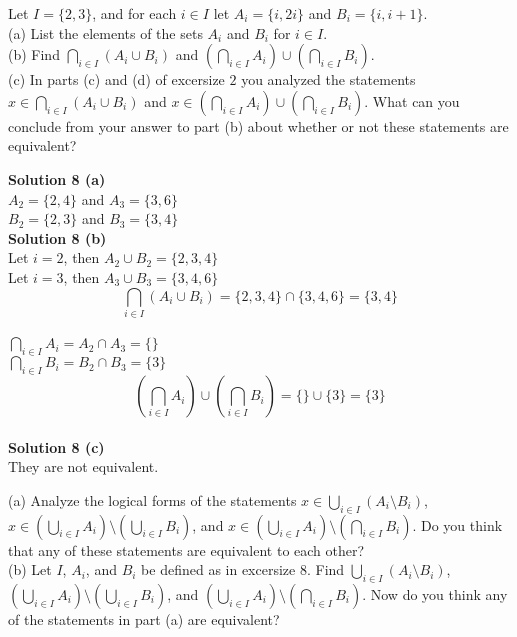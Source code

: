 \begin{tcolorbox}[title=Problem 8, breakable]
    Let $I = \{2, 3\}$, and for each $i \in I$ let $A_i = \{i, 2i\}$ and $B_i = \{i, i + 1\}$. \\
    (a) List the elements of the sets $A_i$ and $B_i$ for $i \in I$. \\
    (b) Find $\bigcap_{i \in I}(A_i \cup B_i)$ 
        and $(\bigcap_{i \in I} A_i)\cup(\bigcap_{i \in I} B_i)$. \\
    (c) In parts (c) and (d) of excersize $2$ you analyzed the statements
        $x \in \bigcap_{i \in I}(A_i \cup B_i)$ and 
        $x \in (\bigcap_{i \in I} A_i) \cup (\bigcap_{i \in I} B_i)$.
        What can you conclude from your answer to part (b) about whether or not these statements
        are equivalent?
\end{tcolorbox}

\textbf{Solution 8 (a)} \\
$A_2 = \{2, 4\}$ and $A_3 = \{3, 6\}$ \\
$B_2 = \{2, 3\}$ and $B_3 = \{3, 4\}$ \\
\textbf{Solution 8 (b)} \\
Let $i = 2$, then $A_2 \cup B_2 = \{2, 3, 4\}$ \\
Let $i = 3$, then $A_3 \cup B_3 = \{3, 4, 6\}$ \\
$$\bigcap_{i \in I}(A_i \cup B_i) = \{2, 3, 4\} \cap \{3, 4, 6\} = \{3, 4\}$$ \\
$\bigcap_{i \in I}A_i = A_2 \cap A_3 = \{\}$ \\
$\bigcap_{i \in I}B_i = B_2 \cap B_3 = \{3\}$ \\
$$\left(\bigcap_{i \in I} A_i\right) \cup \left(\bigcap_{i \in I} B_i\right) = \{\} \cup \{3\} = \{3\}$$ \\
\textbf{Solution 8 (c)} \\
They are not equivalent.

\begin{tcolorbox}[title=Problem 9, breakable]
    (a) Analyze the logical forms of the statements $x \in \bigcup_{i \in I}(A_i \setminus B_i)$,
    $x \in (\bigcup_{i \in I}A_i) \setminus (\bigcup_{i \in I} B_i)$, and
    $x \in (\bigcup_{i \in I}A_i) \setminus (\bigcap_{i \in I} B_i)$. Do you think
    that any of these statements are equivalent to each other? \\
    (b) Let $I$, $A_i$, and $B_i$ be defined as in excersize $8$. Find $\bigcup_{i \in I}(A_i \setminus B_i)$,
    $(\bigcup_{i \in I}A_i) \setminus (\bigcup_{i \in I}B_i)$, and
    $(\bigcup_{i \in I}A_i) \setminus (\bigcap_{i \in I}B_i)$. Now do you think any of the statements 
    in part (a) are equivalent?
\end{tcolorbox}

